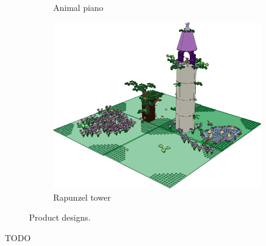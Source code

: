 \documentclass{PDS}
\begin{document}
\begin{figure}[htbp]
\begin{subfigure}[b]{0.3\textwidth}
        \caption{Animal piano}
        \label{fig:piano}
    \end{subfigure}
    \hfill
    \begin{subfigure}[b]{0.3\textwidth}
        \includegraphics[width=\textwidth]{./figures/rapunzel.png}
        \caption{Rapunzel tower}
        \label{fig:rapunzel}
    \end{subfigure}
    \caption{Product designs.}
    \label{fig:kinderuni}
\end{figure}

TODO
\end{document}
